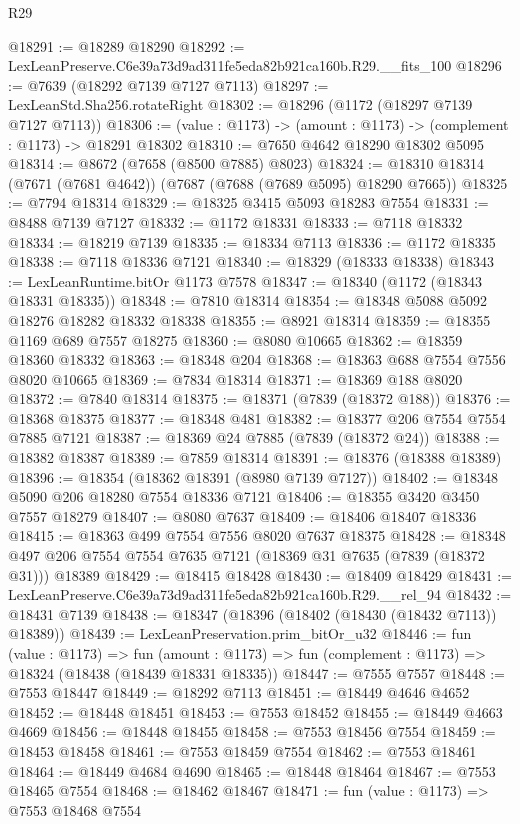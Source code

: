\begin{lexlean}{R29}
\begin{coremodule}
@18291 := @18289 @18290
@18292 := LexLeanPreserve.C6e39a73d9ad311fe5eda82b921ca160b.R29.__fits_100
@18296 := @7639 (@18292 @7139 @7127 @7113)
@18297 := LexLeanStd.Sha256.rotateRight
@18302 := @18296 (@1172 (@18297 @7139 @7127 @7113))
@18306 := (value : @1173) -> (amount : @1173) -> (complement : @1173) -> @18291 @18302
@18310 := @7650 @4642 @18290 @18302 @5095
@18314 := @8672 (@7658 (@8500 @7885) @8023)
@18324 := @18310 @18314 (@7671 (@7681 @4642)) (@7687 (@7688 (@7689 @5095) @18290 @7665))
@18325 := @7794 @18314
@18329 := @18325 @3415 @5093 @18283 @7554
@18331 := @8488 @7139 @7127
@18332 := @1172 @18331
@18333 := @7118 @18332
@18334 := @18219 @7139
@18335 := @18334 @7113
@18336 := @1172 @18335
@18338 := @7118 @18336 @7121
@18340 := @18329 (@18333 @18338)
@18343 := LexLeanRuntime.bitOr @1173 @7578
@18347 := @18340 (@1172 (@18343 @18331 @18335))
@18348 := @7810 @18314
@18354 := @18348 @5088 @5092 @18276 @18282 @18332 @18338
@18355 := @8921 @18314
@18359 := @18355 @1169 @689 @7557 @18275
@18360 := @8080 @10665
@18362 := @18359 @18360 @18332
@18363 := @18348 @204
@18368 := @18363 @688 @7554 @7556 @8020 @10665
@18369 := @7834 @18314
@18371 := @18369 @188 @8020
@18372 := @7840 @18314
@18375 := @18371 (@7839 (@18372 @188))
@18376 := @18368 @18375
@18377 := @18348 @481
@18382 := @18377 @206 @7554 @7554 @7885 @7121
@18387 := @18369 @24 @7885 (@7839 (@18372 @24))
@18388 := @18382 @18387
@18389 := @7859 @18314
@18391 := @18376 (@18388 @18389)
@18396 := @18354 (@18362 @18391 (@8980 @7139 @7127))
@18402 := @18348 @5090 @206 @18280 @7554 @18336 @7121
@18406 := @18355 @3420 @3450 @7557 @18279
@18407 := @8080 @7637
@18409 := @18406 @18407 @18336
@18415 := @18363 @499 @7554 @7556 @8020 @7637 @18375
@18428 := @18348 @497 @206 @7554 @7554 @7635 @7121 (@18369 @31 @7635 (@7839 (@18372 @31))) @18389
@18429 := @18415 @18428
@18430 := @18409 @18429
@18431 := LexLeanPreserve.C6e39a73d9ad311fe5eda82b921ca160b.R29.__rel_94
@18432 := @18431 @7139
@18438 := @18347 (@18396 (@18402 (@18430 (@18432 @7113)) @18389))
@18439 := LexLeanPreservation.prim_bitOr_u32
@18446 := fun (value : @1173) =>
  fun (amount : @1173) => fun (complement : @1173) => @18324 (@18438 (@18439 @18331 @18335))
@18447 := @7555 @7557
@18448 := @7553 @18447
@18449 := @18292 @7113
@18451 := @18449 @4646 @4652
@18452 := @18448 @18451
@18453 := @7553 @18452
@18455 := @18449 @4663 @4669
@18456 := @18448 @18455
@18458 := @7553 @18456 @7554
@18459 := @18453 @18458
@18461 := @7553 @18459 @7554
@18462 := @7553 @18461
@18464 := @18449 @4684 @4690
@18465 := @18448 @18464
@18467 := @7553 @18465 @7554
@18468 := @18462 @18467
@18471 := fun (value : @1173) => @7553 @18468 @7554

\end{coremodule}
\end{lexlean}
